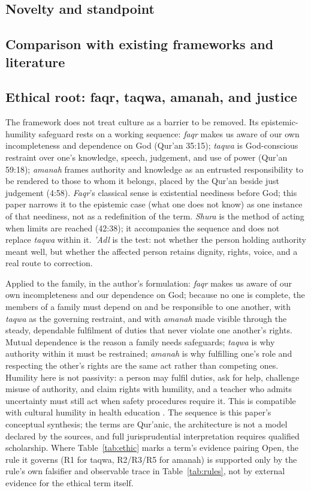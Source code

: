 \documentclass[10pt,twocolumn]{article}
\begin{document}
\subsection{Novelty and standpoint}


\subsection{Comparison with existing frameworks and literature}


\subsection{Ethical root: faqr, taqwa, amanah, and justice}\label{sec:root}
The framework does not treat culture as a barrier to be removed. Its epistemic-humility safeguard rests on a working sequence: \emph{faqr} makes us aware of our own incompleteness and dependence on God (Qur'an 35:15); \emph{taqwa} is God-conscious restraint over one's knowledge, speech, judgement, and use of power (Qur'an 59:18); \emph{amanah} frames authority and knowledge as an entrusted responsibility to be rendered to those to whom it belongs, placed by the Qur'an beside just judgement (4:58). \emph{Faqr}'s classical sense is existential neediness before God; this paper narrows it to the epistemic case (what one does not know) as one instance of that neediness, not as a redefinition of the term. \emph{Shura} is the method of acting when limits are reached (42:38); it accompanies the sequence and does not replace \emph{taqwa} within it. \emph{'Adl} is the test: not whether the person holding authority meant well, but whether the affected person retains dignity, rights, voice, and a real route to correction.

Applied to the family, in the author's formulation: \emph{faqr} makes us aware of our own incompleteness and our dependence on God; because no one is complete, the members of a family must depend on and be responsible to one another, with \emph{taqwa} as the governing restraint, and with \emph{amanah} made visible through the steady, dependable fulfilment of duties that never violate one another's rights. Mutual dependence is the reason a family needs safeguards; \emph{taqwa} is why authority within it must be restrained; \emph{amanah} is why fulfilling one's role and respecting the other's rights are the same act rather than competing ones. Humility here is not passivity: a person may fulfil duties, ask for help, challenge misuse of authority, and claim rights with humility, and a teacher who admits uncertainty must still act when safety procedures require it. This is compatible with cultural humility in health education \cite{ref58}. The sequence is this paper's conceptual synthesis; the terms are Qur'anic, the architecture is not a model declared by the sources, and full jurisprudential interpretation requires qualified scholarship. Where Table~\ref{tab:ethic} marks a term's evidence pairing Open, the rule it governs (R1 for taqwa, R2/R3/R5 for amanah) is supported only by the rule's own falsifier and observable trace in Table~\ref{tab:rules}, not by external evidence for the ethical term itself.
\end{document}

